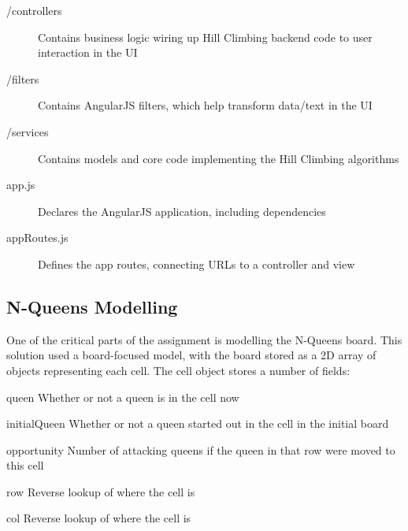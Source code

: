 \begin{description}
  \item[/controllers]   Contains business logic wiring up Hill Climbing backend code to user interaction in the UI
  \item[/filters]       Contains AngularJS filters, which help transform data/text in the UI
  \item[/services]      Contains models and core code implementing the Hill Climbing algorithms
  \item[app.js]         Declares the AngularJS application, including dependencies
  \item[appRoutes.js]   Defines the app routes, connecting URLs to a controller and view
\end{description}

\subsection{N-Queens Modelling}
One of the critical parts of the assignment is modelling the N-Queens board. This solution used a board-focused model,
with the board stored as a 2D array of objects representing each cell. The cell object stores a number of fields:

\begin{description}
\item{queen} Whether or not a queen is in the cell now
\item{initialQueen} Whether or not a queen started out in the cell in the initial board
\item{opportunity} Number of attacking queens if the queen in that row were moved to this cell
\item{row} Reverse lookup of where the cell is
\item{col} Reverse lookup of where the cell is
\end{description}

